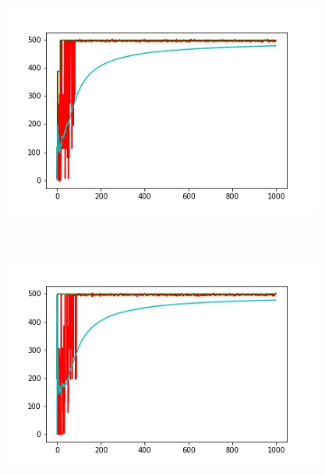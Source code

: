 \begin{figure}
\begin{subfigure}[b]{0.39\textwidth}
        \label{fig:gull}
    \end{subfigure}
    ~ %
    \begin{subfigure}[b]{0.39\textwidth}
        \includegraphics[width=\textwidth]{grafi6.jpg}
        \label{fig:tiger}
    \end{subfigure}
    ~ %
    \begin{subfigure}[b]{0.39\textwidth}
        \includegraphics[width=\textwidth]{grafi7.jpg}
        \label{fig:mouse}
    \end{subfigure}
    \begin{subfigure}[b]{0.39\textwidth}

\end{subfigure}
\end{figure}
